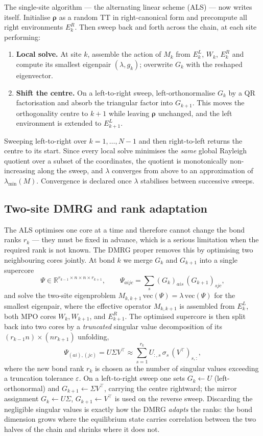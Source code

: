 \documentclass[12pt]{article}
\newcommand{\R}{\mathbb{R}}
\newcommand{\brho}{\boldsymbol{\rho}}
\theoremstyle{definition}
\theoremstyle{remark}
\begin{document}
The single-site algorithm --- the alternating linear scheme (ALS) --- now writes itself. Initialise $\brho$ as a random TT in right-canonical form and precompute all right environments $E^R_k$. Then sweep back and forth across the chain, at each site performing:
\begin{enumerate}
    \item \textbf{Local solve.} At site $k$, assemble the action of $M_k$ from $E^L_k$, $W_k$, $E^R_k$ and compute its smallest eigenpair $(\lambda, g_k)$; overwrite $G_k$ with the reshaped eigenvector.
    \item \textbf{Shift the centre.} On a left-to-right sweep, left-orthonormalise $G_k$ by a QR factorisation and absorb the triangular factor into $G_{k+1}$. This moves the orthogonality centre to $k+1$ while leaving $\brho$ unchanged, and the left environment is extended to $E^L_{k+1}$.
\end{enumerate}
Sweeping left-to-right over $k = 1, \dots, N-1$ and then right-to-left returns the centre to its start. Since every local solve minimises the \emph{same} global Rayleigh quotient over a subset of the coordinates, the quotient is monotonically non-increasing along the sweep, and $\lambda$ converges from above to an approximation of $\lambda_{\min}(M)$. Convergence is declared once $\lambda$ stabilises between successive sweeps.

\subsection{Two-site DMRG and rank adaptation}\label{sec:two-site}

The ALS optimises one core at a time and therefore cannot change the bond ranks $r_k$ --- they must be fixed in advance, which is a serious limitation when the required rank is not known. The DMRG proper removes this by optimising two neighbouring cores jointly. At bond $k$ we merge $G_k$ and $G_{k+1}$ into a single supercore
\[
\Psi \in \R^{r_{k-1} \times n \times n \times r_{k+1}},
\qquad
\Psi_{aijc} = \sum_{s} (G_k)_{ais}\, (G_{k+1})_{sjc},
\]
and solve the two-site eigenproblem $M_{k,k+1}\, \mathrm{vec}(\Psi) = \lambda\, \mathrm{vec}(\Psi)$ for the smallest eigenpair, where the effective operator $M_{k,k+1}$ is assembled from $E^L_k$, both MPO cores $W_k, W_{k+1}$, and $E^R_{k+1}$. The optimised supercore is then split back into two cores by a \emph{truncated} singular value decomposition of its $(r_{k-1} n) \times (n r_{k+1})$ unfolding,
\[
\Psi_{(ai),(jc)} = U \Sigma V^\top
\approx \sum_{s=1}^{r_k} U_{:,s}\, \sigma_s\, (V^\top)_{s,:},
\]
where the new bond rank $r_k$ is chosen as the number of singular values exceeding a truncation tolerance $\varepsilon$. On a left-to-right sweep one sets $G_k \leftarrow U$ (left-orthonormal) and $G_{k+1} \leftarrow \Sigma V^\top$, carrying the centre rightward; the mirror assignment $G_k \leftarrow U\Sigma$, $G_{k+1} \leftarrow V^\top$ is used on the reverse sweep. Discarding the negligible singular values is exactly how the DMRG \emph{adapts} the ranks: the bond dimension grows where the equilibrium state carries correlation between the two halves of the chain and shrinks where it does not.
\end{document}
